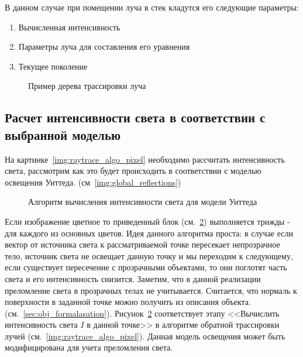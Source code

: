 В данном случае при помещении луча в стек кладутся его следующие параметры:
\begin{enumerate}
	\item Вычисленная интенсивность 
	\item Параметры луча для составления его уравнения 
	\item Текущее поколение \cite{Rodgers}
\end{enumerate}








\begin{figure}[h]
	\centering
	
	\caption{Пример дерева трассировки луча}
	\label{img:raytrace_tree}
\end{figure}

\subsection{Расчет интенсивности света в соответствии с выбранной моделью}
На картинке~\ref{img:raytrace_algo_pixel} необходимо рассчитать интенсивность света, рассмотрим как это будет происходить в соответствии с моделью освещения Уиттеда. (см~\ref{img:global_reflections})
\begin{figure}[H]
	\centering
	
	\caption{Алгоритм вычисления интенсивности света для модели Уиттеда}
	\label{img:yuitted_model_algo}
\end{figure}


Если изображение цветное то приведенный блок (см.~\ref{img:yuitted_model_algo}) выполняется трижды - для каждого из основных цветов. Идея данного алгоритма проста:
в случае если вектор от источника света к рассматриваемой точке пересекает непрозрачное тело, источник света не освещает данную точку и мы переходим к следующему,
если существует пересечение с прозрачными объектами, то они поглотят часть света и его интенсивность снизится. Заметим, что в данной реализации преломление света в прозрачных телах не учитывается.
Считается, что нормаль к поверхности в заданной точке можно получить из описания объекта. (см.~\ref{sec:obj_formalasation}).
Рисунок~\ref{img:yuitted_model_algo} соответствует этапу <<Вычислить интенсивность света \(I\) в данной точке>> в алгоритме обратной трассировки лучей (см.~\ref{img:raytrace_algo_pixel}).
Данная модель освещения может быть модифицирована для учета преломления света. \cite{Rodgers}

